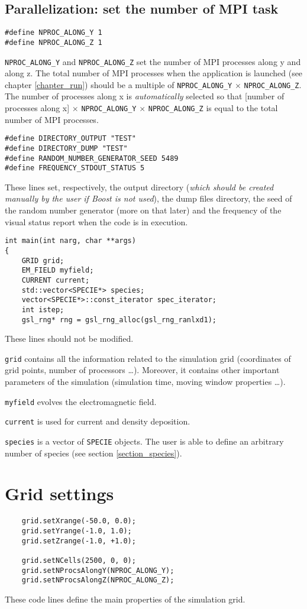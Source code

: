 \documentclass[11pt,a4paper]{report}
\begin{document}
\subsection*{Parallelization: set the number of MPI task}
\begin{lstlisting}
#define NPROC_ALONG_Y 1
#define NPROC_ALONG_Z 1
\end{lstlisting}
\verb+NPROC_ALONG_Y+ and \verb+NPROC_ALONG_Z+ set the number of MPI processes along y and along z. 
The total number of MPI processes when the application is launched (see chapter \ref{chapter_run}) should be a multiple of \verb+NPROC_ALONG_Y+ $\times$ \verb+NPROC_ALONG_Z+. The number of processes along x is \emph{automatically} selected so that [number of processes along x] $\times$ \verb+NPROC_ALONG_Y+ $\times$ \verb+NPROC_ALONG_Z+ is equal to the total number of MPI processes.
\begin{lstlisting}
#define DIRECTORY_OUTPUT "TEST"
#define DIRECTORY_DUMP "TEST"
#define RANDOM_NUMBER_GENERATOR_SEED 5489
#define FREQUENCY_STDOUT_STATUS 5
\end{lstlisting}
These lines set, respectively, the output directory (\emph{which should be created manually by the user if Boost is not used}), the dump files directory, the seed of the random number generator (more on that later) and the frequency of the visual status report when the code is in execution.
\begin{lstlisting}[backgroundcolor=\color{no_modify}]
int main(int narg, char **args)
{
	GRID grid;
	EM_FIELD myfield;
	CURRENT current;
	std::vector<SPECIE*> species;
	vector<SPECIE*>::const_iterator spec_iterator;
	int istep;
	gsl_rng* rng = gsl_rng_alloc(gsl_rng_ranlxd1);
\end{lstlisting}
These lines should not be modified.

\verb+grid+ contains all the information related to the simulation grid (coordinates of grid points, number of processors \ldots). Moreover, it contains other important parameters of the simulation (simulation time, moving window properties \ldots).

\verb+myfield+ evolves the electromagnetic field.

\verb+current+ is used for current and density deposition.

\verb+species+ is a vector of \verb+SPECIE+ objects. The user is able to define an arbitrary number of species (see section \ref{section_species}).


\section{Grid settings}
\begin{lstlisting}
	grid.setXrange(-50.0, 0.0);
	grid.setYrange(-1.0, 1.0);
	grid.setZrange(-1.0, +1.0);

	grid.setNCells(2500, 0, 0);
	grid.setNProcsAlongY(NPROC_ALONG_Y);
	grid.setNProcsAlongZ(NPROC_ALONG_Z);
\end{lstlisting}
These code lines define the main properties of the simulation grid.
\end{document}
